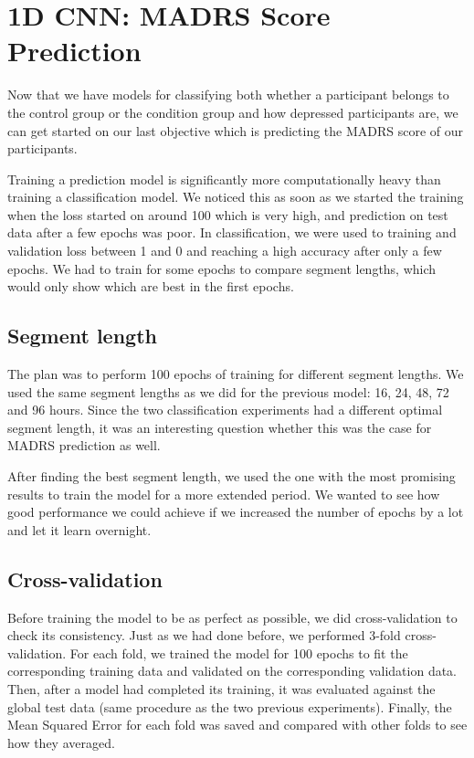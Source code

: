 \section{1D CNN: MADRS Score Prediction}
Now that we have models for classifying both whether a participant belongs to the control group or the condition group and how depressed participants are, we can get started on our last objective which is predicting the MADRS score of our participants. 

Training a prediction model is significantly more computationally heavy than training a classification model. We noticed this as soon as we started the training when the loss started on around 100 which is very high, and prediction on test data after a few epochs was poor. In classification, we were used to training and validation loss between 1 and 0 and reaching a high accuracy after only a few epochs. We had to train for some epochs to compare segment lengths, which would only show which are best in the first epochs.

\subsection{Segment length}
The plan was to perform 100 epochs of training for different segment lengths. We used the same segment lengths as we did for the previous model: 16, 24, 48, 72 and 96 hours. Since the two classification experiments had a different optimal segment length, it was an interesting question whether this was the case for MADRS prediction as well. 

After finding the best segment length, we used the one with the most promising results to train the model for a more extended period. We wanted to see how good performance we could achieve if we increased the number of epochs by a lot and let it learn overnight. 

\subsection{Cross-validation}
Before training the model to be as perfect as possible, we did cross-validation to check its consistency. Just as we had done before, we performed 3-fold cross-validation. For each fold, we trained the model for 100 epochs to fit the corresponding training data and validated on the corresponding validation data. Then, after a model had completed its training, it was evaluated against the global test data (same procedure as the two previous experiments). Finally, the Mean Squared Error for each fold was saved and compared with other folds to see how they averaged. 

